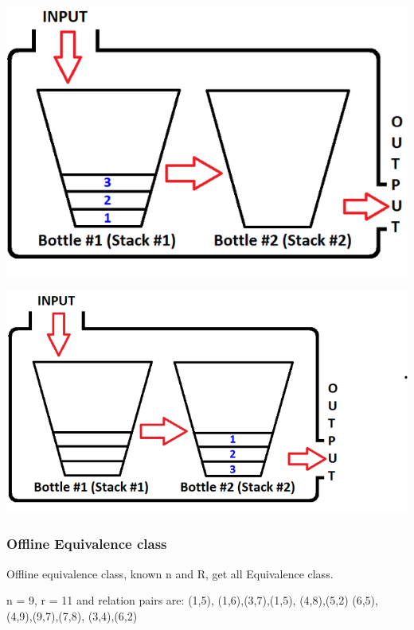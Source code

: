 \documentclass[a4paper,11pt,twoside]{book}
\begin{document}
\begin{minipage}{.5\textwidth}		
	\begin{center}
		\includegraphics[scale=0.25]{pics/sq1.png} 
	\end{center}
\end{minipage}	
\begin{minipage}{.5\textwidth}		
	\begin{center}
		\includegraphics[scale=0.25]{pics/sq2.png} 
	\end{center}
\end{minipage}

\subsubsection{Offline Equivalence class}

	\par Offline equivalence class, known n and R, get all Equivalence class. 
	
	\par n = 9, r = 11 and relation pairs are:
	(1,5), (1,6),(3,7),(1,5), (4,8),(5,2)
	(6,5), (4,9),(9,7),(7,8), (3,4),(6,2)
	
\end{document}
